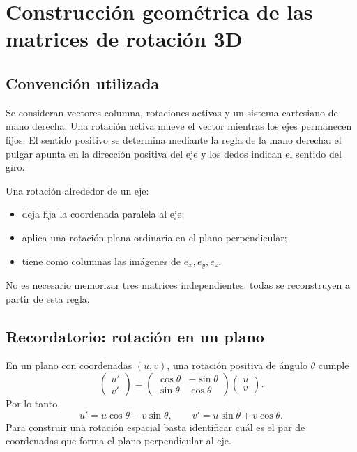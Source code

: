 \section{Construcción geométrica de las matrices de rotación 3D}\label{ap:rot3d}

\subsection{Convención utilizada}

Se consideran vectores columna, rotaciones activas y un sistema cartesiano de mano derecha.
Una rotación activa mueve el vector mientras los ejes permanecen fijos. El sentido positivo
se determina mediante la regla de la mano derecha: el pulgar apunta en la dirección positiva
del eje y los dedos indican el sentido del giro.

\begin{idea}
Una rotación alrededor de un eje:
\begin{itemize}
  \item deja fija la coordenada paralela al eje;
  \item aplica una rotación plana ordinaria en el plano perpendicular;
  \item tiene como columnas las imágenes de \(e_x,e_y,e_z\).
\end{itemize}
No es necesario memorizar tres matrices independientes: todas se reconstruyen a partir de
esta regla.
\end{idea}

\subsection{Recordatorio: rotación en un plano}

En un plano con coordenadas \((u,v)\), una rotación positiva de ángulo \(\theta\) cumple
\[
\begin{pmatrix}u'\\v'\end{pmatrix}
=
\begin{pmatrix}
\cos\theta&-\sin\theta\\
\sin\theta& \cos\theta
\end{pmatrix}
\begin{pmatrix}u\\v\end{pmatrix}.
\]
Por lo tanto,
\[
u'=u\cos\theta-v\sin\theta,
\qquad
v'=u\sin\theta+v\cos\theta.
\]
Para construir una rotación espacial basta identificar cuál es el par de coordenadas que
forma el plano perpendicular al eje.

